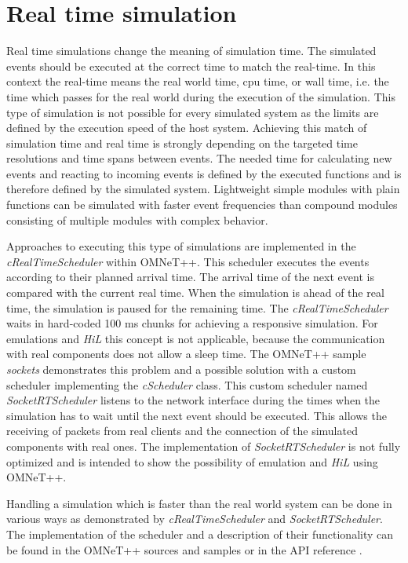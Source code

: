 \section{Real time simulation} %
\label{sec:simulation_real_time}
Real time simulations change the meaning of simulation time.
The simulated events should be executed at the correct time to match the real-time.
In this context the real-time means the real world time, cpu time, or wall time, i.e. the time which passes for the real world during the execution of the simulation.
This type of simulation is not possible for every simulated system as the limits are defined by the execution speed of the host system.
Achieving this match of simulation time and real time is strongly depending on the targeted time resolutions and time spans between events.
The needed time for calculating new events and reacting to incoming events is defined by the executed functions and is therefore defined by the simulated system.
Lightweight simple modules with plain functions can be simulated with faster event frequencies than compound modules consisting of multiple modules with complex behavior.

Approaches to executing this type of simulations are implemented in the \emph{cRealTimeScheduler} within OMNeT++.
This scheduler executes the events according to their planned arrival time.
The arrival time of the next event is compared with the current real time.
When the simulation is ahead of the real time, the simulation is paused for the remaining time.
The \emph{cRealTimeScheduler} waits in hard-coded 100 ms chunks for achieving a responsive simulation.
For emulations and \emph{HiL} this concept is not applicable, because the communication with real components does not allow a sleep time.
The OMNeT++ sample \emph{sockets} demonstrates this problem and a possible solution with a custom scheduler implementing the \emph{cScheduler} class.
This custom scheduler named \emph{SocketRTScheduler} listens to the network interface during the times when the simulation has to wait until the next event should be executed.
This allows the receiving of packets from real clients and the connection of the simulated components with real ones.
The implementation of \emph{SocketRTScheduler} is not fully optimized and is intended to show the possibility of emulation and \emph{HiL} using OMNeT++.

Handling a simulation which is faster than the real world system can be done in various ways as demonstrated by \emph{cRealTimeScheduler} and \emph{SocketRTScheduler}.
The implementation of the scheduler and a description of their functionality can be found in the OMNeT++ sources and samples or in the API reference \cite{omnet_api}.

